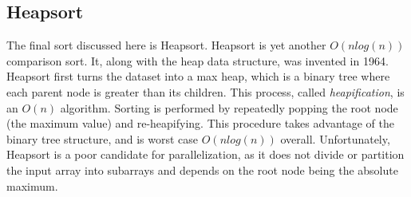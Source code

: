 \documentclass[conference]{IEEEtran}
\begin{document}
	\subsection{Heapsort}
	The final sort discussed here is Heapsort. Heapsort is yet another $O(n log(n))$ comparison sort.
	It, along with the heap data structure, was invented in 1964. \cite{forsythe_algorithms_1964}
	Heapsort first turns the dataset into a max heap, which is a binary tree where each parent node is greater than its children.
	This process, called \textit{heapification}, is an $O(n)$ algorithm.
	Sorting is performed by repeatedly popping the root node (the maximum value) and re-heapifying.
	This procedure takes advantage of the binary tree structure, and is worst case $O(n log (n))$ overall.  \cite{cormen_introduction_2009}
	Unfortunately, Heapsort is a poor candidate for parallelization, as it does not divide or partition the input array into subarrays and depends on the root node being the absolute maximum.
	
\end{document}
